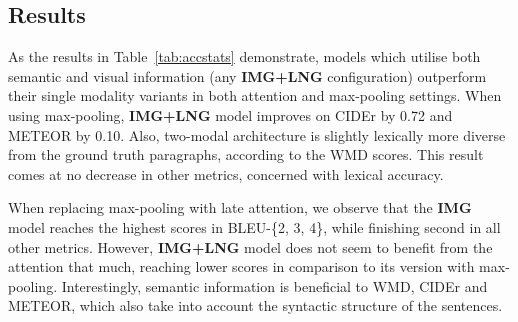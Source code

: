 \documentclass[11pt,a4paper]{article}
\begin{document}

\subsection{Results}

As the results in Table~\ref{tab:accstats} demonstrate, models which utilise both semantic and visual information (any \textbf{IMG+LNG} configuration) outperform their single modality variants in both attention and max-pooling settings.
When using max-pooling, \textbf{IMG+LNG} model improves on CIDEr by 0.72 and METEOR by 0.10.
Also, two-modal architecture is slightly lexically more diverse from the ground truth paragraphs, according to the WMD scores.
This result comes at no decrease in other metrics, concerned with lexical accuracy.

When replacing max-pooling with late attention, we observe that the \textbf{IMG} model reaches the highest scores in BLEU-\{2, 3, 4\}, while finishing second in all other metrics.
However, \textbf{IMG+LNG} model does not seem to benefit from the attention that much, reaching lower scores in comparison to its version with max-pooling.
Interestingly, semantic information is beneficial to WMD, CIDEr and METEOR, which also take into account the syntactic structure of the sentences.
\end{document}
